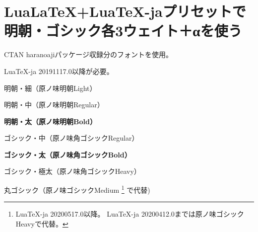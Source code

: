 \documentclass{ltjsarticle}
\begin{document}
\section{Lua\LaTeX +Lua\TeX -jaプリセットで明朝・ゴシック各3ウェイト＋αを使う}

CTAN haranoajiパッケージ収録分のフォントを使用。

Lua\TeX -ja 20191117.0以降が必要。

\vspace{\baselineskip}

\rmfamily
\mcfamily
\ltseries
明朝・細（原ノ味明朝Light）

\mdseries
明朝・中（原ノ味明朝Regular）

\bfseries
明朝・太（原ノ味明朝Bold）

\sffamily
\gtfamily
\mdseries
ゴシック・中（原ノ味角ゴシックRegular）

\bfseries
ゴシック・太（原ノ味角ゴシックBold）

\ebseries
ゴシック・極太（原ノ味角ゴシックHeavy）

\mgfamily
\mdseries
丸ゴシック（原ノ味ゴシックMedium
\footnote{Lua\TeX -ja 20200517.0以降。
Lua\TeX -ja 20200412.0までは原ノ味ゴシックHeavyで代替。}
で代替)
\end{document}
